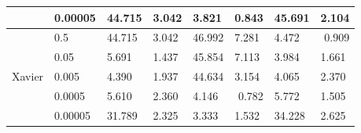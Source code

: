 \begin{table}[H]
\begin{tabular}{cl|llllll|}
\multicolumn{1}{c|}{}                                                         & 0.00005                                                                             & 44.715 & \multicolumn{1}{l|}{3.042} & 3.821  & \multicolumn{1}{r|}{0.843} & 45.691 & 2.104                      \\ \hline
\multicolumn{1}{c|}{\multirow{5}{*}{Xavier}}                                  & 0.5                                                                                 & 44.715 & \multicolumn{1}{l|}{3.042} & 46.992 & \multicolumn{1}{l|}{7.281} & 4.472  & \multicolumn{1}{r|}{0.909} \\
\multicolumn{1}{c|}{}                                                         & 0.05                                                                                & 5.691  & \multicolumn{1}{l|}{1.437} & 45.854 & \multicolumn{1}{l|}{7.113} & 3.984  & 1.661                      \\
\multicolumn{1}{c|}{}                                                         & 0.005                                                                               & 4.390  & \multicolumn{1}{l|}{1.937} & 44.634 & \multicolumn{1}{l|}{3.154} & 4.065  & 2.370                      \\
\multicolumn{1}{c|}{}                                                         & 0.0005                                                                              & 5.610  & \multicolumn{1}{l|}{2.360} & 4.146  & \multicolumn{1}{r|}{0.782} & 5.772  & 1.505                      \\
\multicolumn{1}{c|}{}                                                         & 0.00005                                                                             & 31.789 & \multicolumn{1}{l|}{2.325} & 3.333  & \multicolumn{1}{l|}{1.532} & 34.228 & 2.625                     
\end{tabular}
\end{table}

